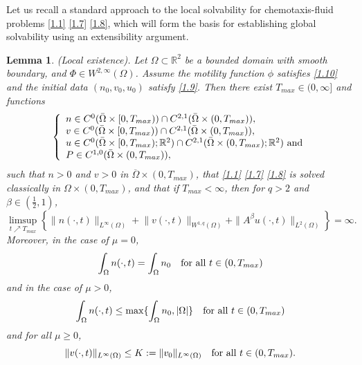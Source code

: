 \documentclass[12pt]{article}
\theoremstyle{plain}
\newtheorem{lemma}{Lemma}[section]
\theoremstyle{definition}
\numberwithin{equation}{section}
\begin{document}
Let us recall  a standard approach to the local solvability for chemotaxis-fluid problems \eqref{1.1} \eqref{1.7} \eqref{1.8}, which will form the basis for establishing global solvability using
an extensibility argument.
\begin{lemma}\label{lemma2.1}(Local existence).
	Let $\Omega\subset\mathbb{R}^{2}$ be a bounded domain with smooth boundary, and $\Phi\in W^{2,\infty}(\Omega)$. Assume the motility function $\phi$  satisfies \eqref{1.10} and the initial data $(n_{0},v_{0},u_{0})$
	satisfy \eqref{1.9}. Then there exist $T_{max}\in(0,\infty]$ and
functions
 \begin{equation}\label{2.1}
		\left\{\begin{array}{l}
			n\in C^{0}(\bar{\Omega}\times[0,T_{max}))\cap C^{2,1}(\bar{\Omega}\times(0,T_{max})),\\
			v\in C^{0}(\bar{\Omega}\times[0,T_{max}))\cap C^{2,1}(\bar{\Omega}\times(0,T_{max})),\\
			u\in C^{0}(\bar{\Omega}\times[0,T_{max}); \mathbb{R}^2)\cap C^{2,1}(\bar{\Omega}\times(0,T_{max}); \mathbb{R}^2)\,\, \hbox{and}\\
P\in C^{1,0}(\bar{\Omega}\times (0,T_{max})),
		\end{array}
		\right.
	\end{equation}
such that  $n> 0$ and  $v> 0$ in $\overline\Omega\times (0,T_{max})$, that  \eqref{1.1} \eqref{1.7} \eqref{1.8} is solved classically in $\Omega\times (0,T_{max})$,  	and that  if
 $T_{max}<\infty$, then for $q>2$ and $\beta\in (\frac12,1)$,
	\begin{equation}\label{2.2}
		\limsup\limits_{t\nearrow T_{max}}\left\{ \|n(\cdot,t)\|_{L^{\infty}(\Omega)}\!
+\!\|v(\cdot,t)\|_{W^{1,q}(\Omega)}+\|A^\beta u(\cdot,t)\|_{L^2(\Omega)}\right\}=\infty.
	\end{equation}
Moreover, in the case of $\mu=0$,
\begin{equation}\label{2.3}
\int_\Omega  n(\cdot,t)=\int_\Omega  n_0 \quad\hbox{for all}  \,\, t
\in(0,T_{max})
\end{equation}
and in the case of $\mu>0$,
\begin{equation}\label{2.3b}
\int_\Omega  n(\cdot,t)\leq \max\{\int_\Omega  n_0,|\Omega|\} \quad\hbox{for all}  \,\, t
\in(0,T_{max})
\end{equation}
and for  all $\mu\geq 0$,  \begin{equation} \label{2.4}
 \|v(\cdot,t)\|_{L^\infty(\Omega)}\leq K:=\|v_{0}\|_{L^{\infty}(\Omega)}
 \quad\hbox{for all}  \,\, t\in(0,T_{max}).
  \end{equation}
\end{lemma}
\end{document}
